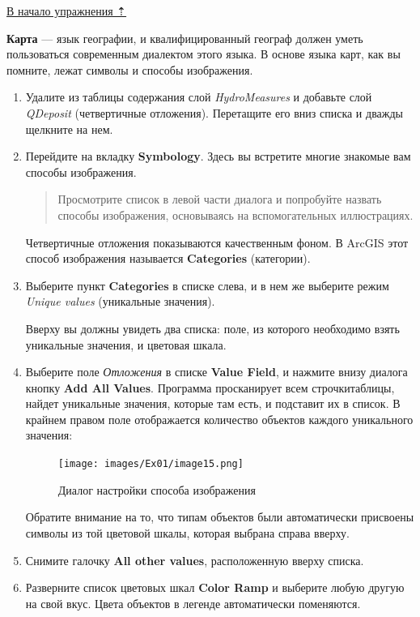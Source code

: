 \documentclass[12pt,]{book}
\begin{document}
\protect\hyperlink{map-design-quaternary}{В начало упражнения ⇡}

\textbf{Карта} --- язык географии, и квалифицированный географ должен уметь пользоваться современным диалектом этого языка. В основе языка карт, как вы помните, лежат символы и способы изображения.

\begin{enumerate}
\def\labelenumi{\arabic{enumi}.}
\item
  Удалите из таблицы содержания слой \emph{HydroMeasures} и добавьте слой \emph{QDeposit} (четвертичные отложения). Перетащите его вниз списка и дважды щелкните на нем.
\item
  Перейдите на вкладку \textbf{Symbology}. Здесь вы встретите многие знакомые вам способы изображения.

  \begin{quote}
  Просмотрите список в левой части диалога и попробуйте назвать способы изображения, основываясь на вспомогательных иллюстрациях.
  \end{quote}

  Четвертичные отложения показываются качественным фоном. В ArcGIS этот способ изображения называется \textbf{Categories} (категории).
\item
  Выберите пункт \textbf{Categories} в списке слева, и в нем же выберите режим \emph{Unique values} (уникальные значения).

  Вверху вы должны увидеть два списка: поле, из которого необходимо взять уникальные значения, и цветовая шкала.
\item
  Выберите поле \emph{Отложения} в списке \textbf{Value Field}, и нажмите внизу диалога кнопку \textbf{Add All Values}. Программа просканирует всем строчкитаблицы, найдет уникальные значения, которые там есть, и подставит их в список. В крайнем правом поле отображается количество объектов каждого уникального значения:

  \begin{figure}
  \centering
  \texttt{[image: images/Ex01/image15.png]}
  \caption{Диалог настройки способа изображения}
  \end{figure}

  Обратите внимание на то, что типам объектов были автоматически присвоены символы из той цветовой шкалы, которая выбрана справа вверху.
\item
  Снимите галочку \textbf{All other values}, расположенную вверху списка.
\item
  Разверните список цветовых шкал \textbf{Color Ramp} и выберите любую другую на свой вкус. Цвета объектов в легенде автоматически поменяются.


\end{enumerate}
\end{document}
